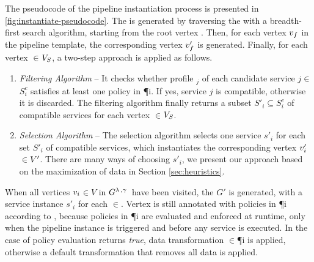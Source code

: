 {\color{OurColor}The pseudocode of the pipeline instantiation process is presented in \cref{fig:instantiate-pseudocode}.} The \pipelineInstance  is generated by traversing the \pipelineTemplate with a breadth-first search algorithm, starting from the root vertex .
Then, for each vertex $v_{f}$ in the pipeline template, the corresponding vertex $v'_{f}$ is generated.
Finally, for each vertex $\in$$V_S$, a two-step approach is applied as follows.

\begin{enumerate}
  \item \textit{Filtering Algorithm} -- It checks whether profile \profile$_j$ of each candidate service $\si{j}$$\in$$S^c_{i}$ satisfies at least one policy in \P{i}. If yes, service $\si{j}$ is compatible, otherwise it is discarded. The filtering algorithm finally returns a subset $S'_{i}$$\subseteq$$S^c_{i}$ of compatible services for each vertex $\in$$V_S$.
  \item \textit{Selection Algorithm} -- The selection algorithm selects one service $s'_i$ for each set $S'_{i}$ of compatible services, which instantiates the corresponding vertex $v'_{i}$$\in$$V'$. There are many ways of choosing $s'_i$, we present our approach based on the maximization of data \quality \emph{\q} in Section \ref{sec:heuristics}.
\end{enumerate}

When all vertices $v_{i}$$\in$$V$ in $G^{\lambda\,,\gamma\,}$ have been visited, the \pipelineInstance $G'$ is generated, with a service instance $s'_i$ for each $\in$\Vp. Vertex  is still annotated with policies in \P{i} according to \myLambda, because policies in \P{i} are evaluated and enforced at runtime, only when the pipeline instance is triggered and before any service is executed. In the case of policy evaluation returns \emph{true}, data transformation \TP$\in$\P{i} is applied, otherwise a default transformation that removes all data is applied.

